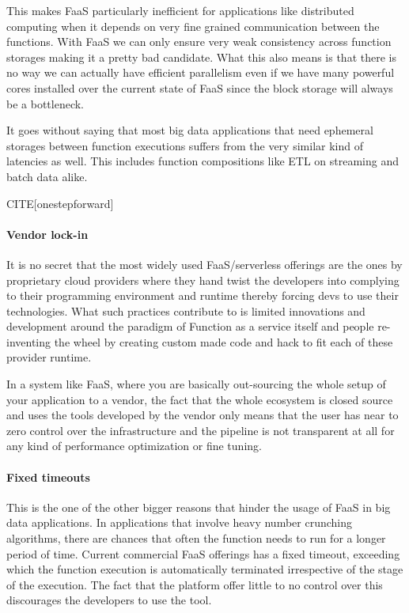 \documentclass[12pt,titlepage]{article}
\begin{document}
This makes FaaS particularly inefficient for applications like distributed
computing when it depends on very fine grained communication between the
functions. With FaaS we can only ensure very weak consistency across function
storages making it a pretty bad candidate. What this also means is that there is
no way we can actually have efficient parallelism even if we have many powerful
cores installed over the current state of FaaS since the block storage will
always be a bottleneck.

It goes without saying that most big data applications that need ephemeral
storages between function executions suffers from the very similar kind of
latencies as well. This includes function compositions like ETL on streaming and
batch data alike.

CITE[onestepforward]

\paragraph{Vendor lock-in}
\label{sec:org600e98c}
It is no secret that the most widely used FaaS/serverless offerings are the ones by
proprietary cloud providers where they hand twist the developers into complying
to their programming environment and runtime thereby forcing devs to use their
technologies. What such practices contribute to is limited innovations and
development around the paradigm of Function as a service itself and people
re-inventing the wheel by creating custom made code and hack to fit each of
these provider runtime.

In a system like FaaS, where you are basically out-sourcing the whole setup of
your application to a vendor, the fact that the whole ecosystem is closed source
and uses the tools developed by the vendor only means that the user has near to
zero control over the infrastructure and the pipeline is not transparent at all
for any kind of performance optimization or fine tuning.

\paragraph{Fixed timeouts}
\label{sec:orgbbf8701}
This is the one of the other bigger reasons that hinder the usage of FaaS in big
data applications. In applications that involve heavy number crunching
algorithms, there are chances that often the function needs to run for a longer
period of time. Current commercial FaaS offerings has a fixed timeout, exceeding
which the function execution is automatically terminated irrespective of the
stage of the execution. The fact that the platform offer little to no control
over this discourages the developers to use the tool.
\end{document}
